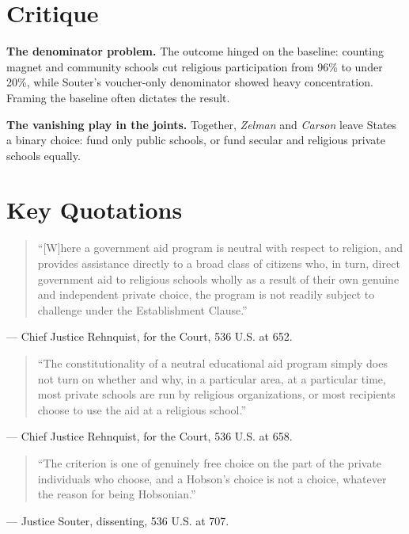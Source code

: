 \documentclass[12pt]{article}
\begin{document}
\section{Critique}

\textbf{The denominator problem.} The outcome hinged on the baseline: counting magnet and community schools cut religious participation from 96\% to under 20\%, while Souter's voucher-only denominator showed heavy concentration. Framing the baseline often dictates the result.

\textbf{The vanishing play in the joints.} Together, \textit{Zelman} and \textit{Carson} leave States a binary choice: fund only public schools, or fund secular and religious private schools equally.

\section{Key Quotations}

\begin{quote}
``[W]here a government aid program is neutral with respect to religion, and provides assistance directly to a broad class of citizens who, in turn, direct government aid to religious schools wholly as a result of their own genuine and independent private choice, the program is not readily subject to challenge under the Establishment Clause.''
\end{quote}
\noindent --- Chief Justice Rehnquist, for the Court, 536 U.S. at 652.

\begin{quote}
``The constitutionality of a neutral educational aid program simply does not turn on whether and why, in a particular area, at a particular time, most private schools are run by religious organizations, or most recipients choose to use the aid at a religious school.''
\end{quote}
\noindent --- Chief Justice Rehnquist, for the Court, 536 U.S. at 658.

\begin{quote}
``The criterion is one of genuinely free choice on the part of the private individuals who choose, and a Hobson's choice is not a choice, whatever the reason for being Hobsonian.''
\end{quote}
\noindent --- Justice Souter, dissenting, 536 U.S. at 707.
\end{document}
